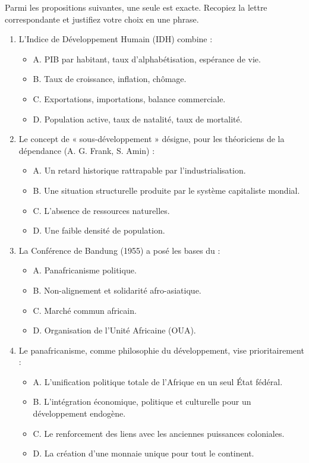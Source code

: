 \documentclass[11pt]{article}
\begin{document}
\begin{exercice}
Parmi les propositions suivantes, une seule est exacte. Recopiez la lettre correspondante et justifiez votre choix en une phrase.

\begin{enumerate}
\item L'Indice de Développement Humain (IDH) combine :
      \begin{itemize}
      \item A. PIB par habitant, taux d'alphabétisation, espérance de vie.
      \item B. Taux de croissance, inflation, chômage.
      \item C. Exportations, importations, balance commerciale.
      \item D. Population active, taux de natalité, taux de mortalité.
      \end{itemize}
\item Le concept de « sous-développement » désigne, pour les théoriciens de la dépendance (A. G. Frank, S. Amin) :
      \begin{itemize}
      \item A. Un retard historique rattrapable par l'industrialisation.
      \item B. Une situation structurelle produite par le système capitaliste mondial.
      \item C. L'absence de ressources naturelles.
      \item D. Une faible densité de population.
      \end{itemize}
\item La Conférence de Bandung (1955) a posé les bases du :
      \begin{itemize}
      \item A. Panafricanisme politique.
      \item B. Non-alignement et solidarité afro-asiatique.
      \item C. Marché commun africain.
      \item D. Organisation de l'Unité Africaine (OUA).
      \end{itemize}
\item Le panafricanisme, comme philosophie du développement, vise prioritairement :
      \begin{itemize}
      \item A. L'unification politique totale de l'Afrique en un seul État fédéral.
      \item B. L'intégration économique, politique et culturelle pour un développement endogène.
      \item C. Le renforcement des liens avec les anciennes puissances coloniales.
      \item D. La création d'une monnaie unique pour tout le continent.
      \end{itemize}
\end{enumerate}
\end{exercice}
\end{document}
